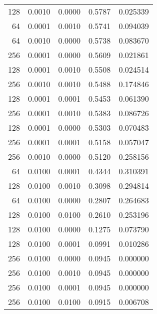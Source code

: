\begin{tabular}{rrrrr}
 128 &  0.0010 &  0.0000 &  0.5787 &  0.025339 \\
  64 &  0.0001 &  0.0010 &  0.5741 &  0.094039 \\
  64 &  0.0010 &  0.0000 &  0.5738 &  0.083670 \\
 256 &  0.0001 &  0.0000 &  0.5609 &  0.021861 \\
 128 &  0.0001 &  0.0010 &  0.5508 &  0.024514 \\
 256 &  0.0010 &  0.0010 &  0.5488 &  0.174846 \\
 128 &  0.0001 &  0.0001 &  0.5453 &  0.061390 \\
 256 &  0.0001 &  0.0010 &  0.5383 &  0.086726 \\
 128 &  0.0001 &  0.0000 &  0.5303 &  0.070483 \\
 256 &  0.0001 &  0.0001 &  0.5158 &  0.057047 \\
 256 &  0.0010 &  0.0000 &  0.5120 &  0.258156 \\
  64 &  0.0100 &  0.0001 &  0.4344 &  0.310391 \\
 128 &  0.0100 &  0.0010 &  0.3098 &  0.294814 \\
  64 &  0.0100 &  0.0000 &  0.2807 &  0.264683 \\
 128 &  0.0100 &  0.0100 &  0.2610 &  0.253196 \\
 128 &  0.0100 &  0.0000 &  0.1275 &  0.073790 \\
 128 &  0.0100 &  0.0001 &  0.0991 &  0.010286 \\
 256 &  0.0100 &  0.0000 &  0.0945 &  0.000000 \\
 256 &  0.0100 &  0.0010 &  0.0945 &  0.000000 \\
 256 &  0.0100 &  0.0001 &  0.0945 &  0.000000 \\
 256 &  0.0100 &  0.0100 &  0.0915 &  0.006708 \\
\bottomrule
\end{tabular}
